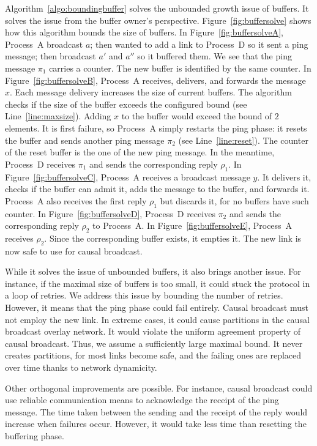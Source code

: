 Algorithm~\ref{algo:boundingbuffer} solves the unbounded growth issue of
buffers. It solves the issue from the buffer owner's
perspective. Figure~\ref{fig:buffersolve} shows how this algorithm bounds the
size of buffers. In Figure~\ref{fig:buffersolveA}, Process~A broadcast $a$; then
wanted to add a link to Process~D so it sent a ping message; then broadcast $a'$
and $a''$ so it buffered them. We see that the ping message $\pi_1$ carries a
counter. The new buffer is identified by the same counter. In
Figure~\ref{fig:buffersolveB}, Process~A receives, delivers, and forwards the
message $x$. Each message delivery increases the size of current buffers. The
algorithm checks if the size of the buffer exceeds the configured bound (see
Line~\ref{line:maxsize}). Adding $x$ to the buffer would exceed the bound of
$2$ elements. It is first failure, so Process~A simply restarts the ping 
phase: it resets the buffer and sends another ping message $\pi_2$ (see
Line~\ref{line:reset}). The counter of the reset buffer is the one of the new
ping message. In the meantime, Process~D receives $\pi_1$ and sends the
corresponding reply $\rho_1$. In Figure~\ref{fig:buffersolveC}, Process~A
receives a broadcast message $y$. It delivers it, checks if the buffer can admit
it, adds the message to the buffer, and forwards it. Process~A also receives the
first reply $\rho_1$ but discards it, for no buffers have such counter. In
Figure~\ref{fig:buffersolveD}, Process~D receives $\pi_2$ and sends the
corresponding reply $\rho_2$ to Process~A. In Figure~\ref{fig:buffersolveE},
Process~A receives $\rho_2$. Since the corresponding buffer exists, it empties
it. The new link is now safe to use for causal broadcast.

While it solves the issue of unbounded buffers, it also brings another
issue. For instance, if the maximal size of buffers is too small, it could stuck
the protocol in a loop of retries. We address this issue by bounding the number
of retries. However, it means that the ping phase could fail
entirely. Causal broadcast must not employ the new link. In extreme cases, it
could cause partitions in the causal broadcast overlay network. It would violate
the uniform agreement property of causal broadcast. Thus, we assume a
sufficiently large maximal bound. It never creates partitions, for most links
become safe, and the failing ones are replaced over time thanks to
network dynamicity.

Other orthogonal improvements are possible. For instance, causal broadcast could
use reliable communication means to acknowledge the receipt of the ping
message. The time taken between the sending and the receipt of the
reply would increase when failures occur. However, it would take less
time than resetting the buffering phase.

